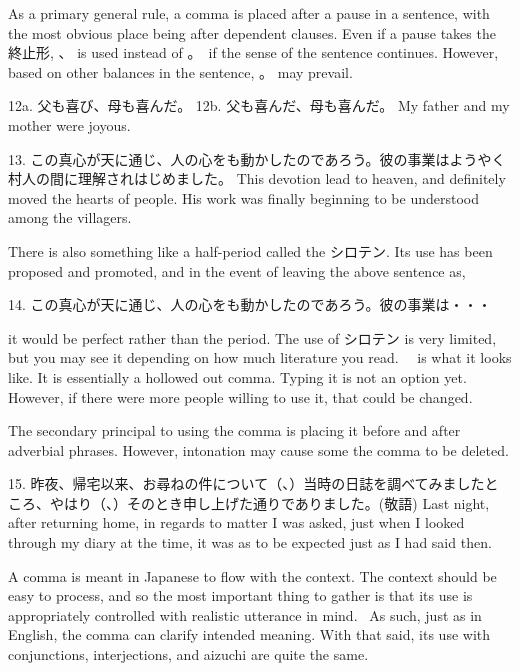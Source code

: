 \par{ As a primary general rule, a comma is placed after a pause in a sentence, with the most obvious place being after dependent clauses. Even if a pause takes the 終止形, 、 is used instead of 。 if the sense of the sentence continues. However, based on other balances in the sentence, 。 may prevail. }

\par{12a. 父も喜び、母も喜んだ。 \hfill\break
12b. 父も喜んだ、母も喜んだ。 \hfill\break
My father and my mother were joyous. }

\par{13. この真心が天に通じ、人の心をも動かしたのであろう。彼の事業はようやく村人の間に理解されはじめました。 \hfill\break
This devotion lead to heaven, and definitely moved the hearts of people. His work was finally beginning to be understood among the villagers. }

\par{ There is also something like a half-period called the シロテン. Its use has been proposed and promoted, and in the event of leaving the above sentence as, }

\par{14. この真心が天に通じ、人の心をも動かしたのであろう。彼の事業は・・・ }

\par{ it would be perfect rather than the period. The use of シロテン is very limited, but you may see it depending on how much literature you read.   is what it looks like. It is essentially a hollowed out comma. Typing it is not an option yet. However, if there were more people willing to use it, that could be changed. }

\par{ The secondary principal to using the comma is placing it before and after adverbial phrases. However, intonation may cause some the comma to be deleted. }

\par{15. 昨夜、帰宅以来、お尋ねの件について（、）当時の日誌を調べてみましたところ、やはり（、）そのとき申し上げた通りでありました。(敬語) \hfill\break
Last night, after returning home, in regards to matter I was asked, just when I looked through my diary at the time, it was as to be expected just as I had said then. }

\par{ A comma is meant in Japanese to flow with the context. The context should be easy to process, and so the most important thing to gather is that its use is appropriately controlled with realistic utterance in mind.  As such, just as in English, the comma can clarify intended meaning. With that said, its use with conjunctions, interjections, and aizuchi are quite the same. }

